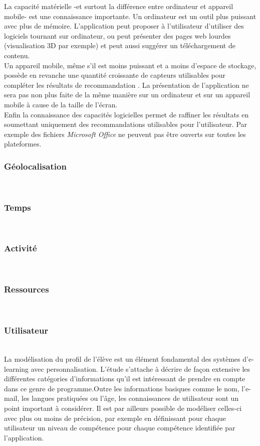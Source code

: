\documentclass[conference]{./sty/IEEEtran}
\begin{document}
La capacité matérielle -et surtout la différence entre ordinateur et appareil
mobile- est une connaissance importante. Un ordinateur est un outil plus
puissant avec plus de mémoire. L'application peut proposer à l'utilisateur
d'utiliser des logiciels tournant sur ordinateur, ou peut présenter des pages
web lourdes (visualisation 3D par exemple) et peut aussi suggérer un
téléchargement de contenu. \\
Un appareil mobile, même s'il est moins puissant et a moins d'espace de
stockage, possède en revanche une quantité croissante de capteurs utilisables
pour compléter les résultats de recommandation \cite{DBLP:conf/wstst/Kurti08}.
La présentation de l'application ne sera pas non plus faite de la même manière
sur un ordinateur et sur un appareil mobile à cause de la taille de l'écran. \\

Enfin la connaissance des capacités logicielles permet de raffiner les résultats
en soumettant uniquement des recommandations utilisables pour l'utilisateur.
Par exemple des fichiers \emph{Microsoft Office} ne peuvent pas être ouverts sur
toutes les plateformes. \\

\subsubsection{Géolocalisation}
~\\

\subsubsection{Temps}
~\\

\subsubsection{Activité}
~\\

\subsubsection{Ressources}
~\\

\subsubsection{Utilisateur}
~\\
La modélisation du profil de l'élève est un élément fondamental des systèmes
d'e-learning avec personnalisation. L'étude
\cite{DBLP:journals/tlt/VerbertMOWDBD12} s'attache à décrire de façon extensive
les différentes catégories d'informations qu'il est intéressant de prendre en
compte dans ce genre de programme.Outre les informations basiques comme le nom,
l'e-mail, les langues pratiquées ou l'âge, les connaissances de utilisateur sont
un point important à considérer. Il est par ailleurs possible de modéliser
celles-ci avec plus ou moins de précision, par exemple en définissant pour
chaque utilisateur un niveau de compétence pour chaque compétence identifiée
par l'application\cite{DBLP:journals/jucs/SternKHKL10}. \\
\end{document}
